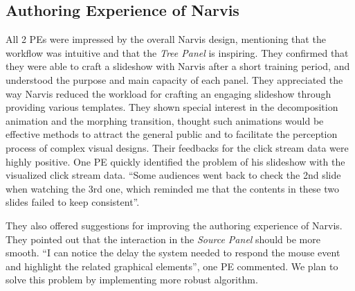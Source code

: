 \subsection{Authoring Experience of Narvis}
All 2 PEs were impressed by the overall Narvis design, mentioning that the workflow was intuitive and that the \textit{Tree Panel} is inspiring. They confirmed that they were able to craft a slideshow with Narvis after a short training period, and understood the purpose and main capacity of each panel. 
They appreciated the way Narvis reduced the workload for crafting an engaging slideshow through providing various templates. They shown special interest in the decomposition animation and the morphing transition, thought such animations would be effective methods to attract the general public and to facilitate the perception process of complex visual designs.  
Their feedbacks for the  click stream data were highly positive. One PE quickly identified the problem of his slideshow with the visualized click stream data. ``Some audiences went back to check the 2nd slide when watching the 3rd one, which reminded me that the contents in these two slides failed to keep consistent''.

They also offered suggestions for improving the authoring experience of Narvis. They pointed out that the interaction in the \textit{Source Panel} should be more smooth. ``I can notice the delay the system needed to respond the mouse event and highlight the related graphical elements'', one PE commented. We plan to solve this problem by implementing more robust algorithm. 

